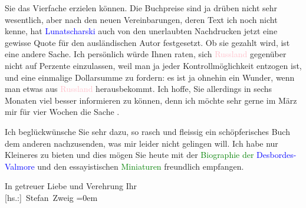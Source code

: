                Sie das Vierfache erzielen können. Die Buchpreise sind ja drüben nicht sehr
               wesentlich, aber nach den neuen Vereinbarungen, deren Text ich noch nicht kenne, hat
                  \textcolor{blue}{Lunatscharski}{}\ledrightnote{\textcolor{blue}{Anatolij W. Lunačarski}} auch von den unerlaubten
               Nachdrucken jetzt eine gewisse Quote für den ausländischen Autor festgesetzt. Ob sie
               gezahlt wird, ist eine andere Sache. Ich persönlich würde Ihnen raten, sich \textcolor{pink}{Russland}{}\ledrightnote{\textcolor{pink}{Russland}} gegenüber nicht auf Perzente
               einzulassen, weil man ja jeder Kontrollmöglichkeit entzogen ist, und eine einmalige
               Dollarsumme zu fordern: es ist ja ohnehin ein Wunder, wenn man etwas aus \textcolor{pink}{Russland}{}\ledrightnote{\textcolor{pink}{Russland}} herausbekommt. Ich hoffe, Sie
               allerdings in sechs Monaten viel besser informieren zu können, denn ich möchte sehr
               gerne im März mir für vier Wochen die Sache \label{K_L03687-3v}\label{}.\pend
           
\pstart
           {\pb}Ich beglückwünsche Sie sehr dazu, so
               rasch und fleissig ein schöpferisches Buch dem anderen nachzusenden, was mir leider
               nicht gelingen will. Ich habe nur Kleineres zu bieten und dies mögen Sie heute mit
               der \textcolor{green}{Biographie der \textcolor{blue}{Desbordes-Valmore}{}\ledrightnote{\textcolor{blue}{Marceline Desbordes}}}{}\ledrightnote{\textcolor{green}{Marceline Desbordes-Valmore. Das Lebensbild einer Dichterin}} und den essayistischen \textcolor{green}{Miniaturen}{}\ledrightnote{{$\rightarrow$}\textcolor{green}{Sternstunden der Menschheit}} freundlich empfangen.\pend
           
\pstart
           In getreuer Liebe und Verehrung Ihr{\\[\baselineskip]}\spacefill\mbox{{[}hs.:{]} Stefan Zweig}\pend
           \leftskip=0em{}\endnumbering{}
\begin{anhang}
\end{anhang}
      